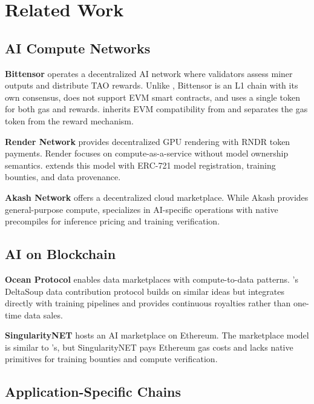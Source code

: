 \section{Related Work}
\label{sec:related}

\subsection{AI Compute Networks}

\textbf{Bittensor} \cite{bittensor2023} operates a decentralized AI network where validators assess miner outputs and distribute TAO rewards. Unlike \Beluga{}, Bittensor is an L1 chain with its own consensus, does not support EVM smart contracts, and uses a single token for both gas and rewards. \Beluga{} inherits EVM compatibility from \Lux{} and separates the gas token from the reward mechanism.

\textbf{Render Network} \cite{render2023} provides decentralized GPU rendering with RNDR token payments. Render focuses on compute-as-a-service without model ownership semantics. \Beluga{} extends this model with ERC-721 model registration, training bounties, and data provenance.

\textbf{Akash Network} \cite{akash2020} offers a decentralized cloud marketplace. While Akash provides general-purpose compute, \Beluga{} specializes in AI-specific operations with native precompiles for inference pricing and training verification.

\subsection{AI on Blockchain}

\textbf{Ocean Protocol} \cite{ocean2019} enables data marketplaces with compute-to-data patterns. \Beluga{}'s DeltaSoup data contribution protocol builds on similar ideas but integrates directly with training pipelines and provides continuous royalties rather than one-time data sales.

\textbf{SingularityNET} \cite{singularitynet2019} hosts an AI marketplace on Ethereum. The marketplace model is similar to \Beluga{}'s, but SingularityNET pays Ethereum gas costs and lacks native primitives for training bounties and compute verification.

\subsection{Application-Specific Chains}

